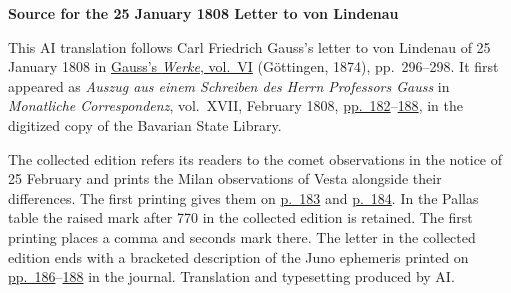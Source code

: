 \clearpage\thispagestyle{empty}
\begin{center}\textbf{Source for the 25 January 1808 Letter to von Lindenau}\end{center}
\noindent This AI translation follows Carl Friedrich Gauss’s letter to von Lindenau of 25 January 1808 in \href{https://gdz.sub.uni-goettingen.de/id/PPN236007467}{Gauss’s \textit{Werke}, vol.~VI} (Göttingen, 1874), pp.~296--298. It first appeared as \textit{Auszug aus einem Schreiben des Herrn Professors Gauss} in \textit{Monatliche Correspondenz}, vol.~XVII, February 1808, \href{https://www.digitale-sammlungen.de/en/view/bsb10538608?page=188}{pp.~182}--\href{https://www.digitale-sammlungen.de/en/view/bsb10538608?page=194}{188}, in the digitized copy of the Bavarian State Library.
\par\medskip
The collected edition refers its readers to the comet observations in the notice of 25 February and prints the Milan observations of Vesta alongside their differences. The first printing gives them on \href{https://www.digitale-sammlungen.de/en/view/bsb10538608?page=189}{p.~183} and \href{https://www.digitale-sammlungen.de/en/view/bsb10538608?page=190}{p.~184}. In the Pallas table the raised mark after 770 in the collected edition is retained. The first printing places a comma and seconds mark there. The letter in the collected edition ends with a bracketed description of the Juno ephemeris printed on \href{https://www.digitale-sammlungen.de/en/view/bsb10538608?page=192}{pp.~186}--\href{https://www.digitale-sammlungen.de/en/view/bsb10538608?page=194}{188} in the journal. Translation and typesetting produced by AI.
\clearpage
